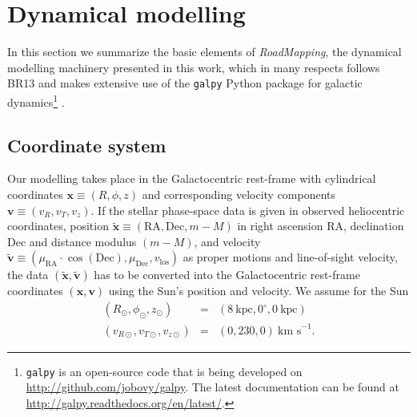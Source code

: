 \documentclass[iop,revtex4,numberedappendix,appendixfloats]{emulateapj}
\newcommand{\vect}[1]{\boldsymbol{#1}}
\newcommand{\RM}{{\sl RoadMapping}}
\begin{document}
\section{Dynamical modelling}

In this section we summarize the basic elements of \RM{}, the dynamical modelling machinery presented in this work, which in many respects follows BR13 and makes extensive use of the \texttt{galpy} Python package for galactic dynamics\footnote{\texttt{galpy} is an open-source code that is being developed on \url{http://github.com/jobovy/galpy}. The latest documentation can be found at \url{http://galpy.readthedocs.org/en/latest/}.} \citep{2015ApJS..216...29B}.


\subsection{Coordinate system} \label{sec:coordinates}

Our modelling takes place in the Galactocentric rest-frame with cylindrical coordinates $\vect{x} \equiv (R,\phi,z)$ and corresponding velocity components $\vect{v} \equiv (v_R,v_T,v_z)$. If the stellar phase-space data is given in observed heliocentric coordinates, position $\tilde{\vect{x}} \equiv(\text{RA},\text{Dec},m-M)$ in right ascension RA, declination Dec and distance modulus $(m-M)$, and velocity $\tilde{\vect{v}} \equiv (\mu_\text{RA} \cdot \cos ( \text{Dec}),\mu_\text{Dec},v_\text{los})$ as proper motions and line-of-sight velocity, the data $(\tilde{\vect{x}},\tilde{\vect{v}})$ has to be converted into the Galactocentric rest-frame coordinates $(\vect{x},\vect{v})$ using the Sun's position and velocity. We assume for the Sun
\begin{eqnarray*}
(R_\odot,\phi_\odot,z_\odot) &=&(8~\text{kpc}, 0^\circ, 0~\text{kpc})\\
(v_{R\odot},v_{T\odot},v_{z\odot}) &=& (0,230,0)~\text{km s}^{-1}.
\end{eqnarray*}

\end{document}
